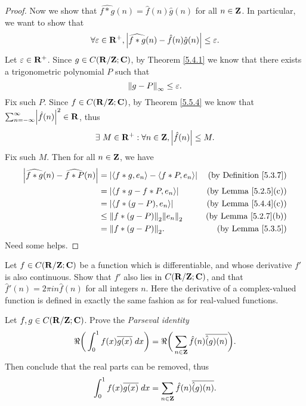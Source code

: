 \begin{proof}
    Now we show that \(\widehat{f * g}(n) = \hat{f}(n) \hat{g}(n)\) for all \(n \in \Z\).
    In particular, we want to show that
    \[
        \forall \varepsilon \in \R^+, \abs{\widehat{f * g}(n) - \hat{f}(n) \hat{g}(n)} \leq \varepsilon.
    \]
    Let \(\varepsilon \in \R^+\).
    Since \(g \in C(\R / \Z ; \C)\), by Theorem \ref{5.4.1} we know that there exists a trigonometric polynomial \(P\) such that
    \[
        \norm*{g - P}_{\infty} \leq \varepsilon.
    \]
    Fix such \(P\).
    Since \(f \in C(\R / \Z ; \C)\), by Theorem \ref{5.5.4} we know that \(\sum_{n = -\infty}^\infty \abs{\hat{f}(n)}^2 \in \R\), thus
    \[
        \exists\ M \in \R^+ : \forall n \in \Z, \abs{\hat{f}(n)} \leq M.
    \]
    Fix such \(M\).
    Then for all \(n \in \Z\), we have
    \begin{align*}
        \abs{\widehat{f * g}(n) - \widehat{f * P}(n)} & = \abs{\inner*{f * g, e_n} - \inner*{f * P, e_n}} & \text{(by Definition \ref{5.3.7})} \\
                                                      & = \abs{\inner*{f * g - f * P, e_n}}               & \text{(by Lemma \ref{5.2.5}(c))}   \\
                                                      & = \abs{\inner*{f * (g - P), e_n}}                 & \text{(by Lemma \ref{5.4.4}(c))}   \\
                                                      & \leq \norm*{f * (g - P)}_2 \norm*{e_n}_2          & \text{(by Lemma \ref{5.2.7}(b))}   \\
                                                      & = \norm*{f * (g - P)}_2.                          & \text{(by Lemma \ref{5.3.5})}
    \end{align*}
    Need some helps.
\end{proof}

\begin{exercise}\label{ex 5.5.4}
    Let \(f \in C(\R / \Z ; \C)\) be a function which is differentiable, and whose derivative \(f'\) is also continuous.
    Show that \(f'\) also lies in \(C(\R / \Z ; \C)\), and that \(\hat{f}'(n) = 2 \pi i n \hat{f}(n)\) for all integers \(n\).
    Here the derivative of a complex-valued function is defined in exactly the same fashion as for real-valued functions.
\end{exercise}

\begin{exercise}\label{ex 5.5.5}
    Let \(f, g \in C(\R / \Z ; \C)\).
    Prove the \emph{Parseval identity}
    \[
        \Re\bigg(\int_0^1 f(x) \overline{g(x)} \; dx\bigg) = \Re\bigg(\sum_{n \in \Z} \hat{f}(n) \overline{\hat(g)(n)}\bigg).
    \]
    Then conclude that the real parts can be removed, thus
    \[
        \int_0^1 f(x) \overline{g(x)} \; dx = \sum_{n \in \Z} \hat{f}(n) \overline{\hat(g)(n)}.
    \]
\end{exercise}

